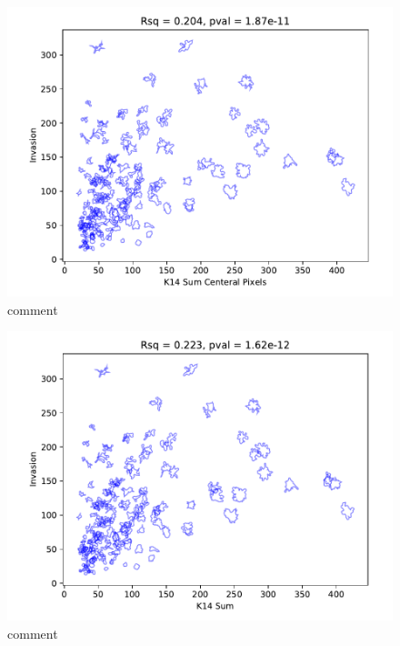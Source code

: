 \documentclass[10pt,letterpaper]{article}
\begin{document}
\begin{figure}[!h]
\includegraphics[width=\textwidth]{docs/01_paper/mouse_1_Day5_KCS.pdf}
\caption{comment} 
\label{fig4}
\end{figure}

\begin{figure}[!h]
\includegraphics[width=\textwidth]{docs/01_paper/mouse_1_Day5_KS.pdf}
\caption{comment} 
\label{fig4}
\end{figure}
\end{document}
